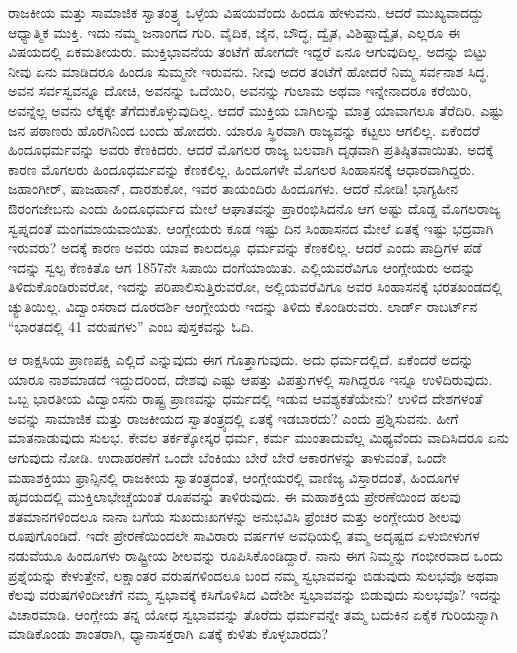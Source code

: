 ರಾಜಕೀಯ ಮತ್ತು ಸಾಮಾಜಿಕ ಸ್ವಾತಂತ್ರ್ಯ ಒಳ್ಳೆಯ ವಿಷಯವೆಂದು ಹಿಂದೂ ಹೇಳುವನು. ಆದರೆ ಮುಖ್ಯವಾದದ್ದು ಆಧ್ಯಾತ್ಮಿಕ ಮುಕ್ತಿ. ಇದು ನಮ್ಮ ಜನಾಂಗದ ಗುರಿ. ವೈದಿಕ, ಜೈನ, ಬೌದ್ಧ, ದ್ವೈತ, ವಿಶಿಷ್ಟಾದ್ವೈತ, ಎಲ್ಲರೂ ಈ ವಿಷಯದಲ್ಲಿ ಏಕಮತೀಯರು.\- ಮುಕ್ತಿಭಾವನೆಯ ತಂಟೆಗೆ ಹೋಗದೇ ಇದ್ದರೆ ಏನೂ ಆಗುವುದಿಲ್ಲ. ಅದನ್ನು ಬಿಟ್ಟು ನೀವು ಏನು ಮಾಡಿದರೂ ಹಿಂದೂ ಸುಮ್ಮನೇ ಇರುವನು. ನೀವು ಅದರ ತಂಟೆಗೆ ಹೋದರೆ ನಿಮ್ಮ ಸರ್ವನಾಶ ಸಿದ್ಧ. ಅವನ ಸರ್ವಸ್ವವನ್ನೂ ದೋಚಿ, ಅವನನ್ನು ಒದೆಯಿರಿ, ಅವನನ್ನು ಗುಲಾಮ ಅಥವಾ ಇನ್ನೇನಾದರೂ ಕರೆಯಿರಿ, ಅವನ್ನೆಲ್ಲ ಅವನು ಲೆಕ್ಕಕ್ಕೇ ತೆಗೆದುಕೊಳ್ಳುವುದಿಲ್ಲ. ಆದರೆ ಮುಕ್ತಿಯ ಬಾಗಿಲನ್ನು ಮಾತ್ರ ಯಾವಾಗಲೂ ತೆರೆದಿರಿ. ಎಷ್ಟು ಜನ ಪಠಾಣರು ಹೊರಗಿನಿಂದ ಬಂದು ಹೋದರು. ಯಾರೂ ಸ್ಥಿರವಾಗಿ ರಾಜ್ಯವನ್ನು ಕಟ್ಟಲು ಆಗಲಿಲ್ಲ. ಏಕೆಂದರೆ ಹಿಂದೂಧರ್ಮವನ್ನು ಅವರು ಕೆಣಕಿದರು. ಆದರೆ ಮೊಗಲರ ರಾಜ್ಯ ಬಲವಾಗಿ ದೃಢವಾಗಿ ಪ್ರತಿಷ್ಠಿತವಾಯಿತು. ಅದಕ್ಕೆ ಕಾರಣ ಮೊಗಲರು ಹಿಂದೂಧರ್ಮವನ್ನು ಕೆಣಕಲಿಲ್ಲ. ಹಿಂದೂಗಳೇ ಮೊಗಲರ ಸಿಂಹಾಸನಕ್ಕೆ ಆಧಾರವಾಗಿದ್ದರು. ಜಹಾಂಗೀರ್​, ಷಾಜಹಾನ್​, ದಾರಶುಕೋ, ಇವರ ತಾಯಂದಿರು ಹಿಂದೂಗಳು. ಆದರೆ ನೋಡಿ! ಭಾಗ್ಯಹೀನ ಔರಂಗಜೇಬನು ಎಂದು ಹಿಂದೂಧರ್ಮದ ಮೇಲೆ ಆಘಾತವನ್ನು ಪ್ರಾರಂಭಿಸಿದನೊ ಆಗ ಅಷ್ಟು ದೊಡ್ಡ ಮೊಗಲರಾಜ್ಯ ಸ್ವಪ್ನದಂತೆ ಮಂಗಮಾಯವಾಯಿತು. ಆಂಗ್ಲೇಯರು ಕೂಡ ಇಷ್ಟು ದಿನ ಸಿಂಹಾಸನದ ಮೇಲೆ ಏತಕ್ಕೆ ಇಷ್ಟು ಭದ್ರವಾಗಿ ಇರುವರು? ಅದಕ್ಕೆ ಕಾರಣ ಅವರು ಯಾವ ಕಾಲದಲ್ಲೂ ಧರ್ಮವನ್ನು ಕೆಣಕಲಿಲ್ಲ. ಆದರೆ ಎಂದು ಪಾದ್ರಿಗಳ ಪಡೆ ಇದನ್ನು ಸ್ವಲ್ಪ ಕೆಣಕಿತೊ ಆಗ 1857ನೇ ಸಿಪಾಯಿ ದಂಗೆಯಾಯಿತು. ಎಲ್ಲಿಯವರೆವಿಗೂ ಆಂಗ್ಲೇಯರು ಅದನ್ನು ತಿಳಿದುಕೊಂಡಿರುವರೋ, ಇದನ್ನು ಪರಿಪಾಲಿಸುತ್ತಿರುವರೋ, ಅಲ್ಲಿಯವರೆವಿಗೂ ಅವರ ಸಿಂಹಾಸನಕ್ಕೆ ಭರತಖಂಡದಲ್ಲಿ ಚ್ಯುತಿಯಿಲ್ಲ. ವಿದ್ವಾಂಸರಾದ ದೂರದರ್ಶಿ ಆಂಗ್ಲೇಯರು ಇದನ್ನು ತಿಳಿದು ಕೊಂಡಿರುವರು. ಲಾರ್ಡ್​ ರಾಬರ್ಟ್​ನ “ಭಾರತದಲ್ಲಿ 41 ವರುಷಗಳು” ಎಂಬ ಪುಸ್ತಕವನ್ನು ಓದಿ.

ಆ ರಾಕ್ಷಸಿಯ ಪ್ರಾಣಪಕ್ಷಿ ಎಲ್ಲಿದೆ ಎನ್ನುವುದು ಈಗ ಗೊತ್ತಾಗುವುದು. ಅದು ಧರ್ಮದಲ್ಲಿದೆ. ಏಕೆಂದರೆ ಅದನ್ನು ಯಾರೂ ನಾಶಮಾಡದೆ ಇದ್ದುದರಿಂದ, ದೇಶವು ಎಷ್ಟು ಆಪತ್ತು ವಿಪತ್ತುಗಳಲ್ಲಿ ಸಾಗಿದ್ದರೂ ಇನ್ನೂ ಉಳಿದಿರುವುದು. ಒಬ್ಬ ಭಾರತೀಯ ವಿದ್ವಾಂಸನು ರಾಷ್ಟ್ರ ಪ್ರಾಣವನ್ನು ಧರ್ಮದಲ್ಲಿ ಇಡುವ ಆವಶ್ಯಕತೆಯೇನು? ಉಳಿದ ದೇಶಗಳಂತೆ ಅವನ್ನು ಸಾಮಾಜಿಕ ಮತ್ತು ರಾಜಕೀಯದ ಸ್ವಾತಂತ್ರ್ಯದಲ್ಲಿ ಏತಕ್ಕೆ ಇಡಬಾರದು? ಎಂದು ಪ್ರಶ್ನಿಸುವನು. ಹೀಗೆ ಮಾತನಾಡುವುದು ಸುಲಭ. ಕೇವಲ ತರ್ಕಕ್ಕೋಸ್ಕರ ಧರ್ಮ, ಕರ್ಮ ಮುಂತಾದುವೆಲ್ಲ ಮಿಥ್ಯವೆಂದು ವಾದಿಸಿದರೂ ಏನು ಆಗುವುದು ನೋಡಿ. ಉದಾಹರಣೆಗೆ ಒಂದೇ ಬೆಂಕಿಯು ಬೇರೆ ಬೇರೆ ಆಕಾರಗಳನ್ನು ತಾಳುವಂತೆ, ಒಂದೇ ಮಹಾಶಕ್ತಿಯು ಫ್ರಾನ್ಸಿನಲ್ಲಿ ರಾಜಕೀಯ ಸ್ವಾತಂತ್ರ್ಯದಂತೆ, ಆಂಗ್ಲೇಯರಲ್ಲಿ ವಾಣಿಜ್ಯ ವಿಸ್ತಾರದಂತೆ, ಹಿಂದೂಗಳ ಹೃದಯದಲ್ಲಿ ಮುಕ್ತಿಲಾಭೇಚ್ಚೆಯಂತೆ ರೂಪವನ್ನು ತಾಳಿರುವುದು. ಈ ಮಹಾಶಕ್ತಿಯ ಪ್ರೇರಣೆಯಿಂದ ಹಲವು ಶತಮಾನಗಳಿಂದಲೂ ನಾನಾ ಬಗೆಯ ಸುಖದುಃಖಗಳನ್ನು ಅನುಭವಿಸಿ ಫ್ರೆಂಚರ ಮತ್ತು ಅಂಗ್ಲೇಯರ ಶೀಲವು ರೂಪುಗೊಂಡಿದೆ. ಇದೇ ಪ್ರೇರಣೆ\-ಯಿಂದಲೇ ಸಾವಿರಾರು ವರ್ಷಗಳ ಅವಧಿಯಲ್ಲಿ ತಮ್ಮ ಅದೃಷ್ಟದ ಏಳು\-ಬೀಳುಗಳ ನಡುವೆಯೂ ಹಿಂದೂಗಳು ರಾಷ್ಟ್ರೀಯ ಶೀಲವನ್ನು ರೂಪಿಸಿಕೊಂಡಿದ್ದಾರೆ. ನಾನು ಈಗ ನಿಮ್ಮನ್ನು ಗಂಭೀರವಾದ ಒಂದು ಪ್ರಶ್ನೆಯನ್ನು ಕೇಳುತ್ತೇನೆ, ಲಕ್ಷಾಂತರ ವರುಷಗಳಿಂದಲೂ ಬಂದ ನಮ್ಮ ಸ್ವಭಾವವನ್ನು ಬಿಡುವುದು ಸುಲಭವೊ ಅಥವಾ ಕೆಲವು ವರುಷಗಳಿಂದೀಚೆಗೆ ನಮ್ಮ ಸ್ವಭಾವಕ್ಕೆ ಕಸಿಗೊಳಿಸಿದ ವಿದೇಶೀ ಸ್ವಭಾವವನ್ನು ಬಿಡುವುದು ಸುಲಭವೊ? ಇದನ್ನು ವಿಚಾರಮಾಡಿ. ಆಂಗ್ಲೇಯ ತನ್ನ ಯೋಧ ಸ್ವಭಾವವನ್ನು ತೊರೆದು ಧರ್ಮವನ್ನೇ ತಮ್ಮ ಬದುಕಿನ ಏಕೈಕ ಗುರಿಯನ್ನಾಗಿ ಮಾಡಿಕೊಂಡು ಶಾಂತರಾಗಿ, ಧ್ಯಾನಾಸಕ್ತರಾಗಿ ಏತಕ್ಕೆ ಕುಳಿತು ಕೊಳ್ಳಬಾರದು?

